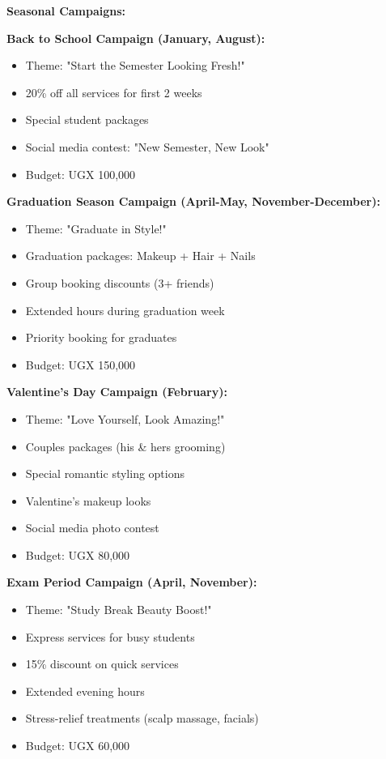 \documentclass[a4paper,12pt]{article}
\begin{document}
\textbf{Seasonal Campaigns:}

\textbf{Back to School Campaign (January, August):}
\begin{itemize}[leftmargin=2em]
    \item Theme: "Start the Semester Looking Fresh!"
    \item 20\% off all services for first 2 weeks
    \item Special student packages
    \item Social media contest: "New Semester, New Look"
    \item Budget: UGX 100,000
\end{itemize}

\textbf{Graduation Season Campaign (April-May, November-December):}
\begin{itemize}[leftmargin=2em]
    \item Theme: "Graduate in Style!"
    \item Graduation packages: Makeup + Hair + Nails
    \item Group booking discounts (3+ friends)
    \item Extended hours during graduation week
    \item Priority booking for graduates
    \item Budget: UGX 150,000
\end{itemize}

\textbf{Valentine's Day Campaign (February):}
\begin{itemize}[leftmargin=2em]
    \item Theme: "Love Yourself, Look Amazing!"
    \item Couples packages (his \& hers grooming)
    \item Special romantic styling options
    \item Valentine's makeup looks
    \item Social media photo contest
    \item Budget: UGX 80,000
\end{itemize}

\textbf{Exam Period Campaign (April, November):}
\begin{itemize}[leftmargin=2em]
    \item Theme: "Study Break Beauty Boost!"
    \item Express services for busy students
    \item 15\% discount on quick services
    \item Extended evening hours
    \item Stress-relief treatments (scalp massage, facials)
    \item Budget: UGX 60,000
\end{itemize}
\end{document}
